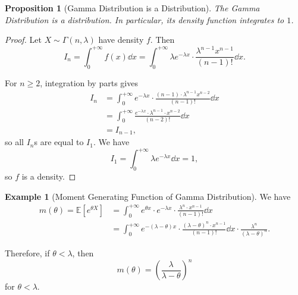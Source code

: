 \documentclass[11pt]{article}
\numberwithin{equation}{section}
\newtheorem{proposition}[theorem]{Proposition}
\theoremstyle{definition}
\newtheorem{example}[theorem]{Example}
\theoremstyle{remark}
\newcommand{\pqty}[1]{\left(#1\right)}
\newcommand{\bqty}[1]{\left[#1\right]}
\newcommand{\plusinfty}{+\infty}
\newcommand{\Expt}{\mathbb E}
\begin{document}
\begin{proposition}[Gamma Distribution is a Distribution]\label{probability-proposition-041}
    \label{probability-prop:gamma-distribution-integral}%
    The Gamma Distribution is a distribution. In particular, its density function integrates to \(1\).
\end{proposition}

\begin{proof}\label{probability-proof-078}
    Let \(X \sim \Gamma\pqty{n, \lambda}\) have density \(f\). Then
    \[
        I_n = \int_{0}^{\plusinfty} f\pqty{x} \dd{x} = \int_{0}^{\plusinfty}  \lambda e^{-\lambda x} \cdot \frac{\lambda^{n - 1} x^{n - 1}}{\pqty{n - 1}!} \dd{x}.
    \]

    For \(n\ge2\), integration by parts gives
    \begin{align*}
        I_n &= \int_{0}^{\plusinfty} e^{-\lambda x} \cdot \frac{\pqty{n - 1} \cdot \lambda^{n - 1} x^{n - 2}}{\pqty{n - 1}!} \dd{x} \\
        &= \int_{0}^{\plusinfty} \frac{e^{-\lambda x} \cdot \lambda^{n - 1} \cdot x^{n - 2}}{\pqty{n - 2}!} \dd{x} \\
        &= I_{n - 1},
    \end{align*}
    so all \(I_n\)s are equal to \(I_1\). We have
    \[
        I_1 = \int_{0}^{\plusinfty} \lambda e^{-\lambda x} \dd{x} = 1,
    \]
    so \(f\) is a density.
\end{proof}

\begin{example}[Moment Generating Function of Gamma Distribution]\label{probability-example-040}
    \label{probability-ex:gamma-distribution-mgf}%
    We have
    \begin{align*}
        m\pqty{\theta} = \Expt\bqty{e^{\theta X}} &= \int_{0}^{\plusinfty} e^{\theta x} \cdot e^{- \lambda x} \cdot \frac{\lambda^n \cdot x^{n - 1}}{\pqty{n - 1}!} \dd{x} \\
        &= \int_{0}^{\plusinfty} e^{- \pqty{\lambda - \theta} x} \cdot \frac{\pqty{\lambda - \theta}^n \cdot x^{n - 1}}{\pqty{n - 1}!} \dd{x} \cdot \frac{\lambda^n}{\pqty{\lambda - \theta}^n}.
    \end{align*}

    Therefore, if \(\theta < \lambda\), then
    \[
        m \pqty{\theta} = \pqty{\frac{\lambda}{\lambda - \theta}}^n
    \]
    for \(\theta < \lambda\).
\end{example}
\end{document}
